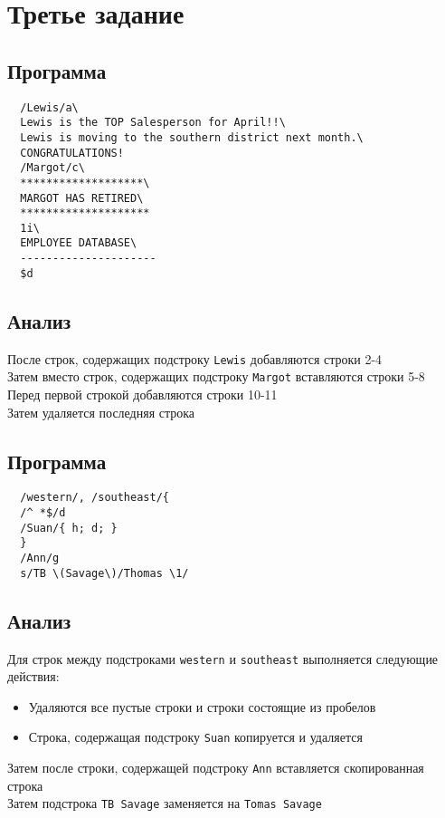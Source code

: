 \documentclass[12pt, a4paper]{article}
\begin{document}
\section*{Третье задание}
\subsection*{Программа}
\verb|  /Lewis/a\|\\
\verb|  Lewis is the TOP Salesperson for April!!\|\\
\verb|  Lewis is moving to the southern district next month.\|\\
\verb|  CONGRATULATIONS!|\\
\verb|  /Margot/c\|\\
\verb|  *******************\|\\
\verb|  MARGOT HAS RETIRED\|\\
\verb|  ********************|\\
\verb|  1i\|\\
\verb|  EMPLOYEE DATABASE\|\\
\verb|  ---------------------|\\
\verb|  $d|\\
\subsection*{Анализ}
После строк, содержащих подстроку \verb|Lewis| добавляются строки 2-4\\
Затем вместо строк, содержащих подстроку \verb|Margot| вставляются строки 5-8\\
Перед первой строкой добавляются строки 10-11\\
Затем удаляется последняя строка
\subsection*{Программа}
\verb|  /western/, /southeast/{|\\
\verb|  /^ *$/d|\\
\verb|  /Suan/{ h; d; }|\\
\verb|  }|\\
\verb|  /Ann/g|\\
\verb|  s/TB \(Savage\)/Thomas \1/|\\
\subsection*{Анализ}
Для строк между подстроками \verb|western| и \verb|southeast| выполняется
следующие действия:
\begin{itemize}
  \item Удаляются все пустые строки и строки состоящие из пробелов
  \item Строка, содержащая подстроку \verb|Suan| копируется и удаляется
\end{itemize}
Затем после строки, содержащей подстроку \verb|Ann| вставляется скопированная
строка\\
Затем подстрока \verb|TB Savage| заменяется на \verb|Tomas Savage|
\end{document}
